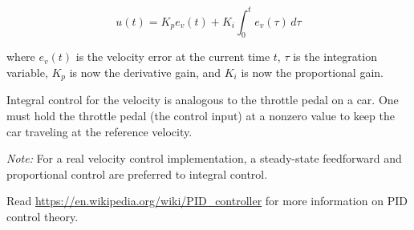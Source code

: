 \begin{theorem}
  \label{thm:vel_pid}

  \begin{equation}
    u(t) = K_p e_v(t) + K_i \int_0^t e_v(\tau) \,d\tau
  \end{equation}

  where $e_v(t)$ is the velocity error at the current time $t$, $\tau$ is the
  integration variable, $K_p$ is now the derivative gain, and $K_i$ is now the
  proportional gain.
\end{theorem}

Integral control for the velocity is analogous to the throttle pedal on a car.
One must hold the throttle pedal (the control input) at a nonzero value to keep
the car traveling at the reference velocity.

\begin{remark}
  \textit{Note:} For a real velocity control implementation, a steady-state
  feedforward and proportional control are preferred to integral control.
\end{remark}

Read \url{https://en.wikipedia.org/wiki/PID_controller} for more information on
PID control theory.
